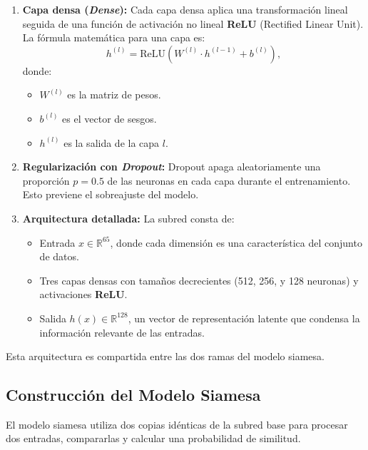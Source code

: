 \begin{enumerate}
    \item \textbf{Capa densa (\textit{Dense}):} Cada capa densa aplica una transformación lineal seguida de una función de activación no lineal \textbf{ReLU} (Rectified Linear Unit). La fórmula matemática para una capa es:
    \[
    h^{(l)} = \text{ReLU}(W^{(l)} \cdot h^{(l-1)} + b^{(l)}),
    \]
    donde:
    \begin{itemize}
        \item \( W^{(l)} \) es la matriz de pesos.
        \item \( b^{(l)} \) es el vector de sesgos.
        \item \( h^{(l)} \) es la salida de la capa \( l \).
    \end{itemize}
    
    \item \textbf{Regularización con \textit{Dropout}:} Dropout apaga aleatoriamente una proporción \( p = 0.5 \) de las neuronas en cada capa durante el entrenamiento. Esto previene el sobreajuste del modelo.

    \item \textbf{Arquitectura detallada:} La subred consta de:
    \begin{itemize}
        \item Entrada \( x \in \mathbb{R}^{65} \), donde cada dimensión es una característica del conjunto de datos.
        \item Tres capas densas con tamaños decrecientes (512, 256, y 128 neuronas) y activaciones \textbf{ReLU}.
        \item Salida \( h(x) \in \mathbb{R}^{128} \), un vector de representación latente que condensa la información relevante de las entradas.
    \end{itemize}
\end{enumerate}

Esta arquitectura es compartida entre las dos ramas del modelo siamesa.

\subsection{Construcción del Modelo Siamesa}

El modelo siamesa utiliza dos copias idénticas de la subred base para procesar dos entradas, compararlas y calcular una probabilidad de similitud.

